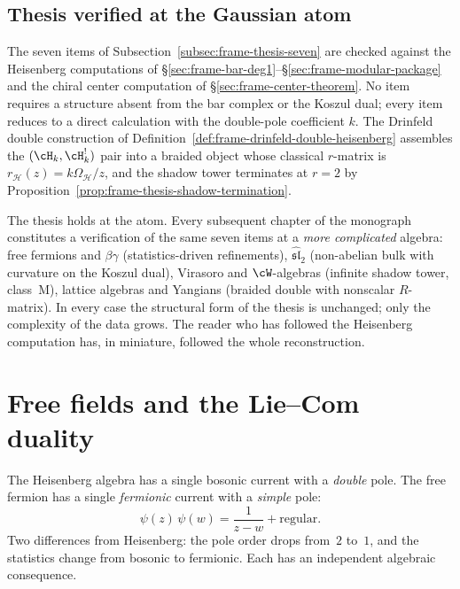 \subsection{Thesis verified at the Gaussian atom}
\label{subsec:frame-thesis-verified}

The seven items of Subsection~\ref{subsec:frame-thesis-seven} are
checked against the Heisenberg computations of
\S\ref{sec:frame-bar-deg1}--\S\ref{sec:frame-modular-package} and
the chiral center computation of
\S\ref{sec:frame-center-theorem}. No item requires a structure
absent from the bar complex or the Koszul dual; every item reduces
to a direct calculation with the double-pole coefficient
$k$. The Drinfeld double construction of
Definition~\ref{def:frame-drinfeld-double-heisenberg} assembles
the $(\cH_k, \cH_k^!)$ pair into a braided object whose classical
$r$-matrix is $r_{\mathcal H}(z)=k\Omega_{\mathcal H}/z$, and the shadow tower terminates at
$r = 2$ by
Proposition~\ref{prop:frame-thesis-shadow-termination}.

The thesis holds at the atom. Every subsequent chapter of the
monograph constitutes a verification of the same seven items at a
\emph{more complicated} algebra: free fermions and $\beta\gamma$
(statistics-driven refinements), $\widehat{\mathfrak{sl}}_2$
(non-abelian bulk with curvature on the Koszul dual), Virasoro
and $\cW$-algebras (infinite shadow tower, class~M), lattice
algebras and Yangians (braided double with nonscalar $R$-matrix).
In every case the structural form of the thesis is unchanged;
only the complexity of the data grows. The reader who has
followed the Heisenberg computation has, in miniature, followed
the whole reconstruction.

\section{Free fields and the Lie--Com duality}
\label{sec:frame-free-fields}

The Heisenberg algebra has a single bosonic current with a
\emph{double} pole. The free fermion has a single
\emph{fermionic} current with a \emph{simple} pole:
\begin{equation}\label{eq:frame-fermion-ope}
\psi(z)\,\psi(w) = \frac{1}{z-w} + \text{regular}.
\end{equation}
Two differences from Heisenberg: the pole order drops from~$2$
to~$1$, and the statistics change from bosonic to fermionic.
Each has an independent algebraic consequence.

